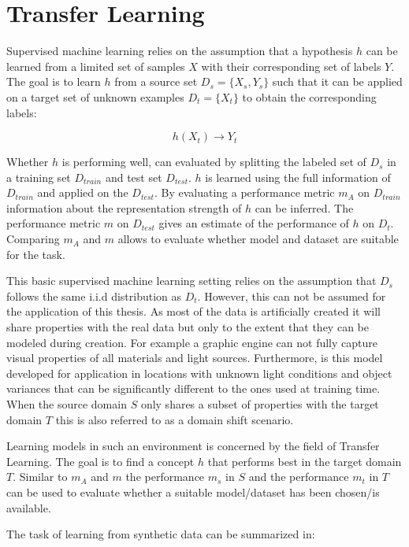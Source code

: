 \chapter{Transfer Learning}
\label{sec:training}

Supervised machine learning relies on the assumption that a hypothesis $h$ can be learned from a limited set of samples $X$ with their corresponding set of labels $Y$. The goal is to learn $h$ from a source set $D_s = \{X_{s},Y_{s}\}$ such that it can be applied on a target set of unknown examples $D_t = \{X_{t}\}$ to obtain the corresponding labels:

$$
h(X_t)\rightarrow Y_t
$$ 

Whether $h$ is performing well, can evaluated by splitting the labeled set of $D_s$ in a training set $D_{train}$ and test set $D_{test}$. $h$ is learned using the full information of $D_{train}$ and applied on the $D_{test}$. By evaluating a performance metric $m_A$ on $D_{train}$ information about the representation strength of $h$ can be inferred. The performance metric $m$ on $D_{test}$ gives an estimate of the performance of $h$ on $D_t$. Comparing $m_A$ and $m$ allows to evaluate whether model and dataset are suitable for the task.
			
This basic supervised machine learning setting relies on the assumption that $D_s$ follows the same i.i.d distribution as $D_t$. However, this can not be assumed for the application of this thesis. As most of the data is artificially created it will share properties with the real data but only to the extent that they can be modeled during creation. For example a graphic engine can not fully capture visual properties of all materials and light sources. Furthermore, is this model developed for application in locations with unknown light conditions and object variances that can be significantly different to the ones used at training time. When the source domain $S$ only shares a subset of properties with the target domain $T$ this is also referred to as a domain shift scenario. 


Learning models in such an environment is concerned by the field of Transfer Learning. The goal is to find a concept $h$ that performs best in the target domain $T$. Similar to $m_A$ and $m$ the performance $m_s$ in $S$ and the performance $m_t$ in $T$ can be used to evaluate whether a suitable model/dataset has been chosen/is available.

The task of learning from synthetic data can be summarized in:

